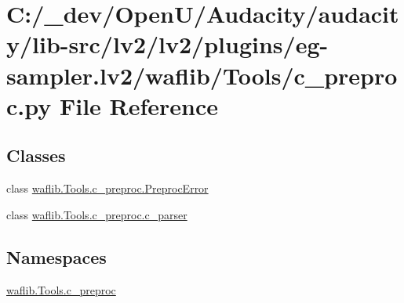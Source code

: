 \hypertarget{lv2_2plugins_2eg-sampler_8lv2_2waflib_2_tools_2c__preproc_8py}{}\section{C\+:/\+\_\+dev/\+Open\+U/\+Audacity/audacity/lib-\/src/lv2/lv2/plugins/eg-\/sampler.lv2/waflib/\+Tools/c\+\_\+preproc.py File Reference}
\label{lv2_2plugins_2eg-sampler_8lv2_2waflib_2_tools_2c__preproc_8py}
\subsection*{Classes}
\begin{DoxyCompactItemize}
\item 
class \hyperlink{classwaflib_1_1_tools_1_1c__preproc_1_1_preproc_error}{waflib.\+Tools.\+c\+\_\+preproc.\+Preproc\+Error}
\item 
class \hyperlink{classwaflib_1_1_tools_1_1c__preproc_1_1c__parser}{waflib.\+Tools.\+c\+\_\+preproc.\+c\+\_\+parser}
\end{DoxyCompactItemize}
\subsection*{Namespaces}
\begin{DoxyCompactItemize}
\item 
 \hyperlink{namespacewaflib_1_1_tools_1_1c__preproc}{waflib.\+Tools.\+c\+\_\+preproc}
\end{DoxyCompactItemize}
